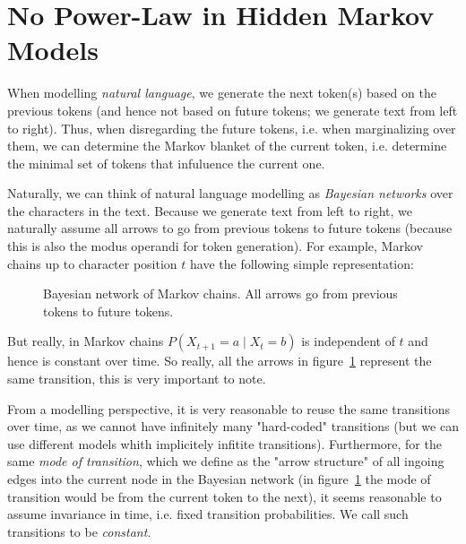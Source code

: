 \documentclass[../../main.tex]{subfiles}
\begin{document}
\section{No Power-Law in Hidden Markov Models}
    When modelling \emph{natural language}, we generate the next token(s) based on the previous tokens (and hence not based on future tokens; we generate text from left to right). Thus, when disregarding the future tokens, i.e. when marginalizing over them, we can determine the Markov blanket of the current token, i.e. determine the minimal set of tokens that infuluence the current one.

    Naturally, we can think of natural language modelling as \emph{Bayesian networks} over the characters in the text. Because we generate text from left to right, we naturally assume all arrows to go from previous tokens to future tokens (because this is also the modus operandi for token generation). For example, Markov chains up to character position $t$ have the following simple representation:

    \begin{figure}[h]
        \center
        \caption{Bayesian network of Markov chains. All arrows go from previous tokens to future tokens.}
        \label{fig:bayesian_network_markov_chain}
    \end{figure}

    But really, in Markov chains $P(X_{t + 1} = a \mid X_t = b)$ is independent of $t$ and hence is constant over time. So really, all the arrows in figure~\ref{fig:bayesian_network_markov_chain} represent the same transition, this is very important to note.

    From a modelling perspective, it is very reasonable to reuse the same transitions over time, as we cannot have infinitely many "hard-coded" transitions (but we can use different models whith implicitely infitite transitions). Furthermore, for the same \emph{mode of transition}, which we define as the "arrow structure" of all ingoing edges into the current node in the Bayesian network (in figure~\ref{fig:bayesian_network_markov_chain} the mode of transition would be from the current token to the next), it seems reasonable to assume invariance in time, i.e. fixed transition probabilities. We call such transitions to be \emph{constant}.
\end{document}
